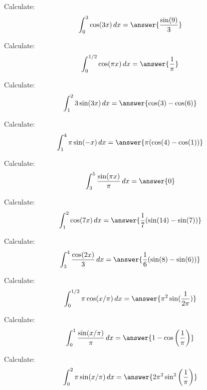 \documentclass{ximera}
\begin{document}
\begin{exercise}
\begin{problem} Calculate:
\[
\int_0^3 \cos(3x) \d x = \answer{\frac{\sin (9)}{3}}
\]
\end{problem}


\begin{problem} Calculate:
\[
\int_0^{1/2} \cos(\pi x) \d x = \answer{\frac{1}{\pi }}
\]
\end{problem}




\begin{problem} Calculate:
\[
\int_1^2 3\sin(3x) \d x = \answer{\cos (3)-\cos (6)}
\]
\end{problem}



\begin{problem} Calculate:
\[
\int_1^4 \pi \sin(- x) \d x = \answer{\pi  (\cos (4)-\cos (1))}
\]
\end{problem}



\begin{problem} Calculate:
\[
\int_3^5 \frac{\sin(\pi x)}{\pi} \d x = \answer{0}
\]
\end{problem}



\begin{problem} Calculate:
\[
\int_1^2 \cos(7 x) \d x= \answer{\frac{1}{7} (\sin (14)-\sin (7))}
\]
\end{problem}



\begin{problem} Calculate:
\[
\int_3^4 \frac{\cos(2 x)}{3} \d x=\answer{\frac{1}{6} (\sin (8)-\sin (6))}
\]
\end{problem}


\begin{problem} Calculate:
\[
\int_0^{1/2} \pi \cos(x/\pi) \d x = \answer{\pi ^2 \sin (\frac{1}{2 \pi })}
\]
\end{problem}


\begin{problem} Calculate:
\[
\int_0^1 \frac{\sin(x/\pi)}{\pi} \d x = \answer{1-\cos \left(\frac{1}{\pi }\right)}
\]
\end{problem}



\begin{problem} Calculate:
\[
\int_0^2 \pi\sin(x/\pi) \d x =\answer{2 \pi ^2 \sin ^2\left(\frac{1}{\pi }\right)}
\]
\end{problem}




\end{exercise}
\end{document}
